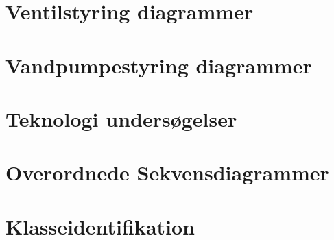 \newpage
\section{Ventilstyring diagrammer}


\newpage
\section{Vandpumpestyring diagrammer}


\newpage
\section{Teknologi undersøgelser}


\newpage
\section{Overordnede Sekvensdiagrammer}


\newpage
\section{Klasseidentifikation}
